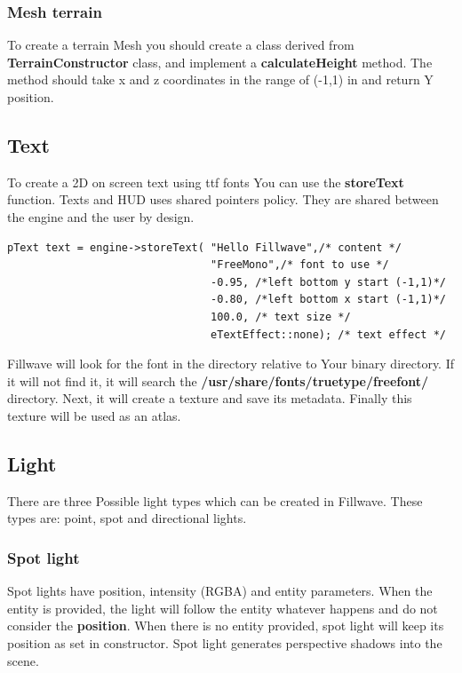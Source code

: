 \documentclass{article}
\begin{document}
\subsubsection{Mesh terrain}\label{sec:MeshTerrain}
\indent \indent To create a terrain Mesh you should create a class derived from \textbf{TerrainConstructor} class, and implement a \textbf{calculateHeight} method. The method should take x and z coordinates in the range of (-1,1) in and return Y position.

\subsection{Text}\label{sec:Text}
\indent \indent To create a 2D on screen text using ttf fonts You can use the \textbf{storeText} function. Texts and HUD uses shared pointers policy. They are shared between the engine and the user by design.

\begin{lstlisting}
pText text = engine->storeText( "Hello Fillwave",/* content */
                                "FreeMono",/* font to use */
                                -0.95, /*left bottom y start (-1,1)*/    
                                -0.80, /*left bottom x start (-1,1)*/     
                                100.0, /* text size */
                                eTextEffect::none); /* text effect */
\end{lstlisting}

\indent \indent Fillwave will look for the font in the directory relative to Your binary directory. If it will not find it, it will search the \textbf{/usr/share/fonts/truetype/freefont/} directory. Next, it will create a texture and save its metadata. Finally this texture will be used as an atlas.

\subsection{Light}\label{sec:Light}
\indent \indent There are three Possible light types which can be created in Fillwave. These types are: point, spot and directional lights.


\subsubsection{Spot light}\label{sec:Spot light}
\indent \indent Spot lights have position, intensity (RGBA) and entity parameters. When the entity is provided, the light will follow the entity whatever happens and do not consider the \textbf{position}. When there is no entity provided, spot light will keep its position as set in constructor. Spot light generates perspective shadows into the scene.
\end{document}
